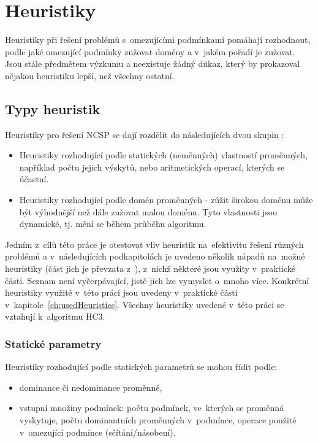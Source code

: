 \section{Heuristiky}
Heuristiky při řešení problémů s~omezujícími podmínkami pomáhají rozhodnout, podle jaké omezující podmínky zužovat domény a v~jakém pořadí je zužovat. Jsou stále předmětem výzkumu a neexistuje žádný důkaz, který by prokazoval nějakou heuristiku lepší, než všechny ostatní. 

\subsection{Typy heuristik}
Heuristiky pro řešení NCSP se dají rozdělit do následujících dvou skupin \cite{feiten10}:

\begin{itemize}
  \item Heuristiky rozhodující podle statických (neměnných) vlastností proměnných, například počtu jejich výskytů, nebo aritmetických operací, kterých se účastní.
  \item Heuristiky rozhodující podle domén proměnných - zúžit širokou doménu může být výhodnější než dále zužovat malou doménu. Tyto vlastnosti jsou dynamické, tj. mění se během průběhu algoritmu.
\end{itemize}


Jedním z~cílů této práce je otestovat vliv heuristik na~efektivitu řešení různých problémů a v~následujících podkapitolách je uvedeno několik nápadů na~možné heuristiky (část jich je převzata z~\cite{feiten10}), z~nichž některé jsou využity v~praktické části. Seznam není vyčerpávající, jistě jich lze vymyslet o~mnoho více. Konkrétní heuristiky využité v~této práci jsou uvedeny v~praktické části v~kapitole~\ref{ch:usedHeuristics}. Všechny heuristiky uvedené v~této práci se vztahují k~algoritmu HC3.

\subsubsection{Statické parametry}

Heuristiky rozhodující podle statických parametrů se mohou řídit podle:

\begin{itemize}
  \item dominance či nedominance proměnné,
  \item vstupní množiny podmínek:
        \subitem počtu podmínek, ve~kterých se proměnná vyskytuje,
        \subitem počtu dominantních proměnných v~podmínce,
        \subitem operace použité v~omezující podmínce (sčítání/násobení).
\end{itemize}


